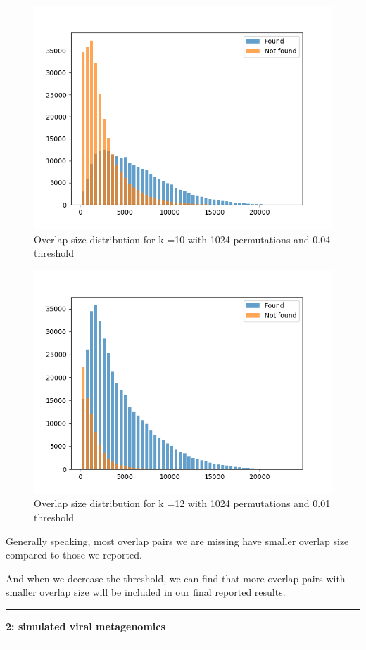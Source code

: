 \documentclass[11pt]{article}
\newcommand\question[2]{\vspace{.25in}\hrule\textbf{#1: #2}\vspace{.5em}\hrule\vspace{.10in}}
\begin{document}
\begin{figure}[H]
	\centering
	\includegraphics[width = .8\textwidth]{Ecoli_Pacbio_simulate_30X_k10_1024_0p04.png}
	\caption{Overlap size distribution for k =10 with 1024 permutations and 0.04 threshold}
	\label{fig2}
\end{figure}

\begin{figure}[H]
	\centering
	\includegraphics[width = .8\textwidth]{Ecoli_Pacbio_simulate_30X_k12_1024_0p01.png}
	\caption{Overlap size distribution for k =12 with 1024 permutations and 0.01 threshold}
	\label{fig3}
\end{figure}

Generally speaking, most overlap pairs we are missing have smaller overlap size compared to those we reported.

And when we decrease the threshold, we can find that more overlap pairs with smaller overlap size will be included in our final reported results.

\question{2}{simulated viral metagenomics}
\end{document}
